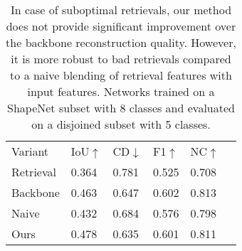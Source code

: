 {
\setlength{\tabcolsep}{5pt}
\begin{table}
    \centering
    \small
    \caption{Smaller sized chunk retrievals improve the performance of both retrieval and refinement, although at cost of a larger database. Evaluation performed on 3D super-resolution task on 3DFront dataset.}
    \label{tab:patchsize_ablation}
\end{table}
}

\begin{table}
    \centering
    \small
    \begin{tabular}{|l|l|l|l|l|l|} 
        \hline
        Variant & IoU$\uparrow$ & CD$\downarrow$ & F1$\uparrow$ & NC$\uparrow$ \\
        \thickhline
        Retrieval & 0.364 & 0.781 & 0.525 & 0.708 \\
        Backbone & 0.463 & 0.647 & 0.602 & 0.813 \\
        Naive & 0.432 & 0.684 & 0.576 & 0.798 \\
        Ours  & 0.478 & 0.635 & 0.601 & 0.811 \\
        \hline
    \end{tabular}
    \caption{In case of suboptimal retrievals, our method does not provide significant improvement over the backbone reconstruction quality. However, it is more robust to bad retrievals compared to a naive blending of retrieval features with input features. Networks trained on a ShapeNet subset with 8 classes and evaluated on a disjoined subset with 5 classes.}
    \label{tab:appendix_unseen_classes}
\end{table}

